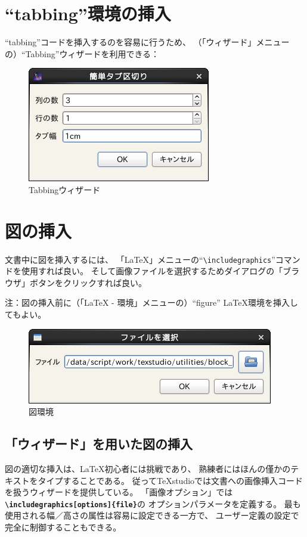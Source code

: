 \section{``tabbing''環境の挿入}

``tabbing''コードを挿入するのを容易に行うため、
（「ウィザード」メニューの）``Tabbing''ウィザードを利用できる：

\begin{figure}[H]
  \centering
  \includegraphics{doc8.png}
  \caption{Tabbingウィザード}
\end{figure}

\section{図の挿入}

文書中に図を挿入するには、
「LaTeX」メニューの``\verb+\includegraphics+''コマンドを使用すれば良い。
そして画像ファイルを選択するためダイアログの「ブラウザ」ボタンをクリックすれば良い。

注：図の挿入前に（「LaTeX - 環境」メニューの）``figure'' LaTeX環境を挿入してもよい。

\begin{figure}[H]
  \centering
  \includegraphics{doc9.png}
  \caption{図環境}
\end{figure}

\subsection{「ウィザード」を用いた図の挿入}

図の適切な挿入は、LaTeX初心者には挑戦であり、
熟練者にはほんの僅かのテキストをタイプすることである。
従ってTeXstudioでは文書への画像挿入コードを扱うウィザードを提供している。
「画像オプション」では
\textbf{\texttt{\textbackslash{}includegraphics[options]\{file\}}}の
オプションパラメータを定義する。
最も使用される幅／高さの属性は容易に設定できる一方で、
ユーザー定義の設定で完全に制御することもできる。


